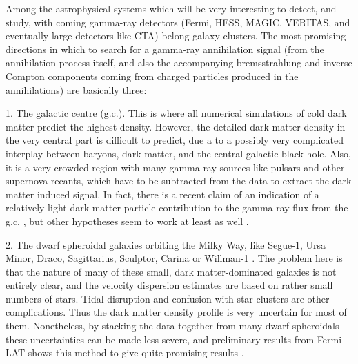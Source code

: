 \documentclass[10pt,aps,pra,reprint,amsmath,amsfonts,amssymb,showpacs]{revtex4-1}
\begin{document}
Among the astrophysical systems which will be very interesting to
detect, and study, with coming gamma-ray detectors (Fermi, HESS,
MAGIC, VERITAS, and eventually large detectors like CTA) belong galaxy
clusters. The most promising directions in which to search for a
gamma-ray annihilation signal (from the annihilation process itself,
and also the accompanying bremsstrahlung and inverse Compton
components coming from charged particles produced in the annihilations)
are basically three:

1. The galactic centre (g.c.). This is where all numerical simulations
of cold dark matter predict the highest density. However, the detailed
dark matter density in the very central part is difficult to predict,
due a to a possibly very complicated interplay between baryons, dark
matter, and the central galactic black hole. Also, it is a very
crowded region with many gamma-ray sources like pulsars and other
supernova recants, which have to be subtracted from the data to
extract the dark matter induced signal. In fact, there is a recent
claim of an indication of a relatively light dark matter particle
contribution to the gamma-ray flux from the
g.c. \cite{2010arXiv1010.2752H}, but other hypotheses seem to work at
least as well \cite{2010arXiv1012.5839B}.

2. The dwarf spheroidal galaxies orbiting the Milky Way, like Segue-1,
Ursa Minor, Draco, Sagittarius, Sculptor, Carina or Willman-1
\cite{2009JCAP...01..016B,2010ApJ...720.1174A,2010JCAP...01..031S,2010JCAP...01..031S}. The
problem here is that the nature of many of these small, dark
matter-dominated galaxies is not entirely clear, and the velocity
dispersion estimates are based on rather small numbers of stars. Tidal
disruption and confusion with star clusters are other
complications. Thus the dark matter density profile is very uncertain
for most of them. Nonetheless, by stacking the data together from many
dwarf spheroidals these uncertainties can be made less severe, and
preliminary results from Fermi-LAT shows this method to give quite
promising results \cite{garde}.
\end{document}
